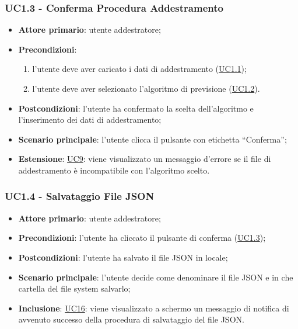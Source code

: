 	\subsubsection{UC1.3 - Conferma Procedura Addestramento}
		\begin{itemize}
			\item\textbf{Attore primario}: utente addestratore;
			\item\textbf{Precondizioni}:
				\begin{enumerate}
					\item l’utente deve aver caricato i dati di addestramento (\hyperref[par:UC1.1]{UC1.1});
					\item  l’utente deve aver selezionato l’algoritmo di previsione (\hyperref[par:UC1.2]{UC1.2}).
				\end{enumerate}
			\item\textbf{Postcondizioni}: l’utente ha confermato la scelta dell’algoritmo e l’inserimento dei dati di addestramento;
					
			\item\textbf{Scenario principale}: l’utente clicca il pulsante con etichetta “Conferma”;
			\item\textbf{Estensione}: \hyperref[par:UC9]{UC9}: viene visualizzato un messaggio d’errore se il file di addestramento è incompatibile con l’algoritmo scelto. 	
		\end{itemize}

	\label{par:UC1.4}
	\subsubsection{UC1.4 - Salvataggio File JSON}
		\begin{itemize}
			\item\textbf{Attore primario}: utente addestratore;
			\item\textbf{Precondizioni}: l’utente ha cliccato il pulsante di conferma (\hyperref[par:UC1.3]{UC1.3});
			\item\textbf{Postcondizioni}: l’utente ha salvato il file JSON in locale;
			\item\textbf{Scenario principale}: l’utente decide come denominare il file JSON e in che cartella del file system salvarlo;  
			\item\textbf{Inclusione}: \hyperref[par:UC16]{UC16}: viene visualizzato a schermo un messaggio di notifica di avvenuto successo della procedura di salvataggio del file JSON.			
		\end{itemize}

